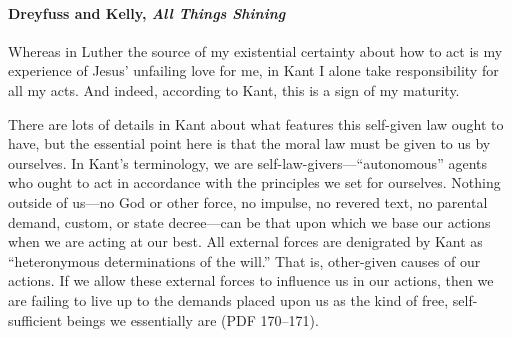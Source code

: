 		\paragraph{Dreyfuss and Kelly, \textit{All Things Shining}}
		
			Whereas in Luther the source of my existential certainty about how to act is my experience of Jesus' unfailing love for me, in Kant I alone take responsibility for all my acts. And indeed, according to Kant, this is a sign of my maturity.

			There are lots of details in Kant about what features this self-given law ought to have, but the essential point here is that the moral law must be given to us by ourselves. In Kant's terminology, we are self-law-givers---``autonomous'' agents who ought to act in accordance with the principles we set for ourselves. Nothing outside of us---no God or other force, no impulse, no revered text, no parental demand, custom, or state decree---can be that upon which we base our actions when we are acting at our best. All external forces are denigrated by Kant as ``heteronymous determinations of the will.'' That is, other-given causes of our actions. If we allow these external forces to influence us in our actions, then we are failing to live up to the demands placed upon us as the kind of free, self-sufficient beings we essentially are (PDF 170--171).